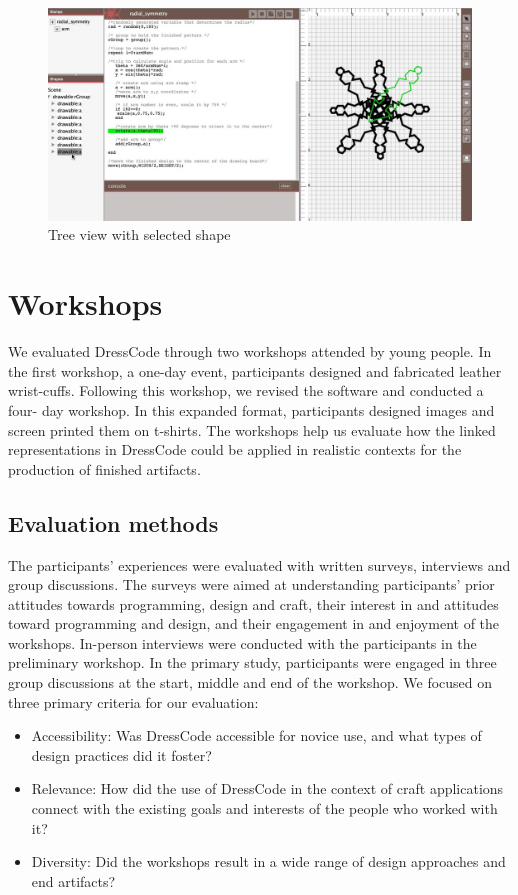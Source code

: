 \documentclass{sigchi}
\begin{document}
\begin{center}
\begin{figure}[h!]
\includegraphics[width=\columnwidth]{images/selection_mechanism.jpg}
\caption{Tree view with selected shape}
\label{fig:tree_view}
\end{figure}
\end{center}
\vspace{20pt}

\section{Workshops}
We evaluated DressCode through two workshops attended by young people. In the first workshop, a one-day event, participants designed and fabricated leather wrist-cuffs. Following this workshop, we revised the software and conducted a four- day workshop. In this expanded format, participants designed images and screen printed them on t-shirts. The workshops help us evaluate how the linked representations in DressCode could be applied in realistic contexts for the production of finished artifacts. 

\subsection{Evaluation methods}
The participants' experiences were evaluated with written surveys, interviews and group discussions. The surveys were aimed at understanding participants' prior attitudes towards programming, design and craft, their interest in and attitudes toward programming and design, and their engagement in and enjoyment of the workshops. In-person interviews were conducted with the participants in the preliminary workshop. In the primary study, participants were engaged in three group discussions at the start, middle and end of the workshop. We focused on three primary criteria for our evaluation:
\begin{itemize}
\item Accessibility: Was DressCode accessible for novice use, and what types of design practices did it foster?
\item Relevance: How did the use of DressCode in the context of craft applications connect with the existing goals and interests of the people who worked with it?
\item Diversity: Did the workshops result in a wide range of design approaches and end artifacts?
\end{itemize}
\end{document}
